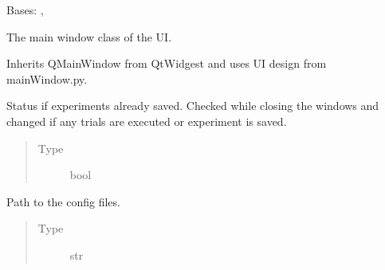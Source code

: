 \documentclass[letterpaper,10pt,english]{sphinxmanual}
\begin{document}
\begin{fulllineitems}
\label{\detokenize{NoSeMazeController/main:main.MainApp}}
\pysigstartsignatures
{}
\pysigstopsignatures
\sphinxAtStartPar
Bases: , {\hyperref[\detokenize{NoSeMazeController/Designs:Designs.mainWindow.Ui_MainWindow}]{}}

\sphinxAtStartPar
The main window class of the UI.

\sphinxAtStartPar
Inherits QMainWindow from QtWidgest and uses UI design from
mainWindow.py.

\begin{fulllineitems}
\label{\detokenize{NoSeMazeController/main:main.MainApp.saved_status}}
\pysigstartsignatures
{}
\pysigstopsignatures
\sphinxAtStartPar
Status if experiments already saved. Checked while closing the windows
and changed if any trials are executed or experiment is saved.
\begin{quote}\begin{description}
\item[{Type}] \leavevmode
\sphinxAtStartPar
bool

\end{description}\end{quote}

\end{fulllineitems}


\begin{fulllineitems}
\label{\detokenize{NoSeMazeController/main:main.MainApp.config_path}}
\pysigstartsignatures
{}
\pysigstopsignatures
\sphinxAtStartPar
Path to the config files.
\begin{quote}\begin{description}
\item[{Type}] \leavevmode
\sphinxAtStartPar
str

\end{description}\end{quote}


\end{fulllineitems}
\end{fulllineitems}
\end{document}
